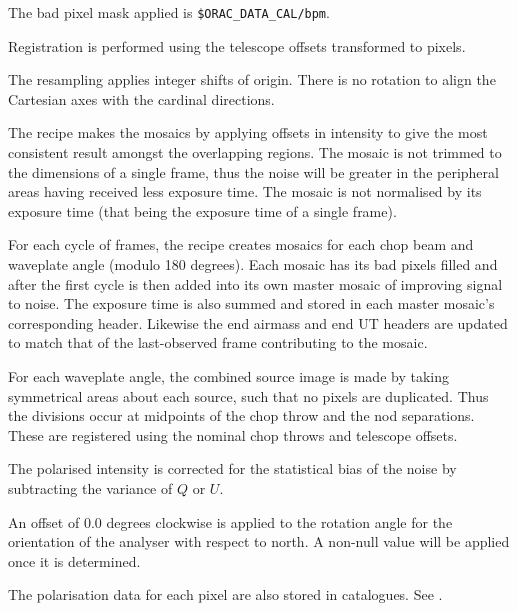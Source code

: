 \documentclass[twoside,11pt,nolof]{starlink}
\begin{document}
{{{         \sstitem
         The bad pixel mask applied is {\tt\$ORAC\_DATA\_CAL/bpm}.

         \sstitem
         Registration is performed using the telescope offsets
         transformed to pixels.

         \sstitem
         The resampling applies integer shifts of origin.   There is no
         rotation to align the Cartesian axes with the cardinal directions.

         \sstitem
         The recipe makes the mosaics by applying offsets in intensity
         to give the most consistent result amongst the overlapping regions.
         The mosaic is not trimmed to the dimensions of a single frame, thus
         the noise will be greater in the peripheral areas having received
         less exposure time.  The mosaic is not normalised by its exposure
         time (that being the exposure time of a single frame).

         \sstitem
         For each cycle of frames, the recipe creates mosaics for each
         chop beam and waveplate angle (modulo 180 degrees).  Each mosaic
         has its bad pixels filled and after the first cycle is then added
         into its own master mosaic of improving signal to noise.  The
         exposure time is also summed and stored in each master mosaic's
         corresponding header.  Likewise the end airmass and end UT headers
         are updated to match that of the last-observed frame contributing
         to the mosaic.

         \sstitem
         For each waveplate angle, the combined source image is made by
         taking symmetrical areas about each source, such that no pixels
         are duplicated.  Thus the divisions occur at midpoints of the chop
         throw and the nod separations.  These are registered using the
         nominal chop throws and telescope offsets.

         \sstitem
         The polarised intensity is corrected for the statistical bias
         of the noise by subtracting the variance of $Q$ or $U$.

         \sstitem
         An offset of 0.0 degrees clockwise is applied to the rotation
         angle for the orientation of the analyser with respect to north.
         A non-null value will be applied once it is determined.

         \sstitem
         The polarisation data for each pixel are also stored in
         catalogues.  See .

}}}
\end{document}
